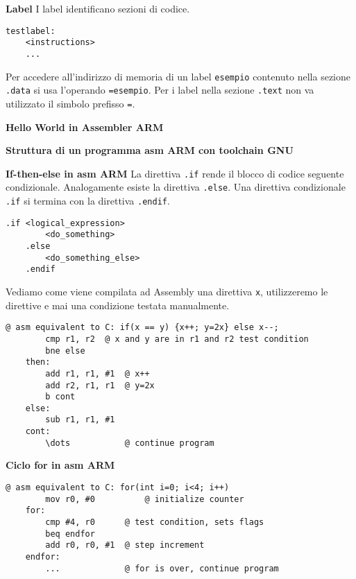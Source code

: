 \begin{defn}
	\textbf{Label}
	I label identificano sezioni di codice.
	
	\begin{lstlisting}[style=arm]
	testlabel:
	<instructions>
	...
	\end{lstlisting}

	Per accedere all'indirizzo di memoria di un label \verb|esempio| contenuto nella sezione \verb|.data| si usa l'operando \verb|=esempio|. Per i label nella sezione \verb|.text| non va utilizzato il simbolo prefisso \verb|=|.
\end{defn}

\begin{exmp}
	\textbf{Hello World in Assembler ARM}
\end{exmp}

\begin{defn}
	\textbf{Struttura di un programma asm ARM con toolchain GNU}
\end{defn}

\begin{defn}
	\textbf{If-then-else in asm ARM}
	La direttiva \verb|.if| rende il blocco di codice seguente condizionale. Analogamente esiste la direttiva \verb|.else|. Una direttiva condizionale \verb|.if| si termina con la direttiva \verb|.endif|.
	\begin{lstlisting}[style=armn]
	.if <logical_expression>
		<do_something>
	.else
		<do_something_else>
	.endif
	\end{lstlisting}
	

	Vediamo come viene compilata ad Assembly una direttiva \verb|x|, utilizzeremo le direttive e mai una condizione testata manualmente.
	\begin{lstlisting}[style=armn]
	@ asm equivalent to C: if(x == y) {x++; y=2x} else x--;
		cmp r1, r2 	@ x and y are in r1 and r2 test condition
		bne else
	then:
		add r1, r1, #1 	@ x++
		add r2, r1, r1	@ y=2x
		b cont
	else:
		sub r1, r1, #1
	cont:
		\dots			@ continue program
	\end{lstlisting}
\end{defn}

\begin{defn}
	\textbf{Ciclo for in asm ARM}

	\begin{lstlisting}[style=armn]
	@ asm equivalent to C: for(int i=0; i<4; i++)
		mov r0, #0			@ initialize counter
	for:
		cmp #4, r0		@ test condition, sets flags
		beq endfor
		add r0, r0, #1 	@ step increment
	endfor:
		... 			@ for is over, continue program
	\end{lstlisting}
\end{defn}

